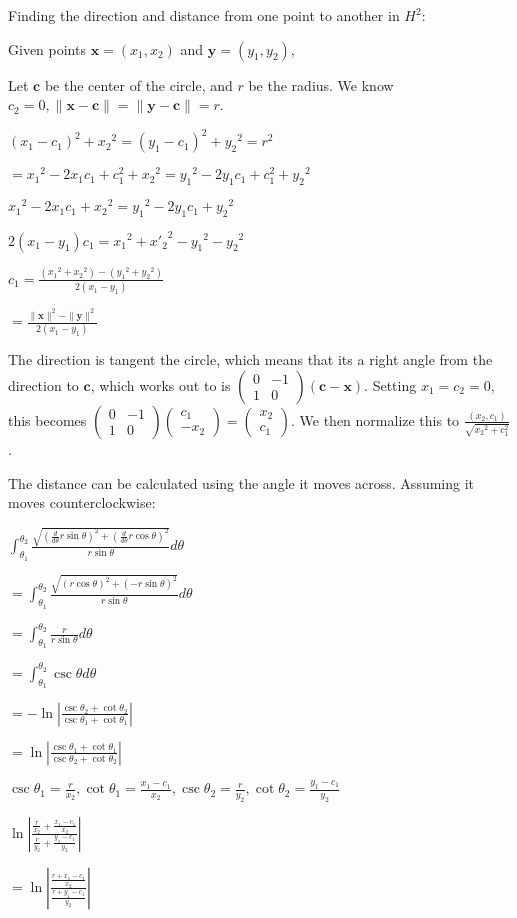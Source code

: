 \documentclass[12pt]{amsart}
\newcommand{\mat}[4]{\left(\begin{array}{ccc} #1 & #2 \\#3 & #4 \end{array} \right)}
\newcommand{\vect}[2]{\left(\begin{array}{ccc} #1 \\#2 \end{array} \right)}
\begin{document}
Finding the direction and distance from one point to another in $H^2$:

Given points $\textbf{x} = (x_1,x_2)$ and $\textbf{y} = (y_1,y_2)$,

Let $\textbf{c}$ be the center of the circle, and $r$ be the radius. We know $c_2 = 0, \|\textbf{x}-\textbf{c}\| = \|\textbf{y}-\textbf{c}\| = r$.

$(x_1-c_1)^2+{x_2}^2 = (y_1-c_1)^2+{y_2}^2 = r^2$

$= {x_1}^2-2x_1c_1+c_1^2+{x_2}^2 = {y_1}^2-2y_1c_1+c_1^2+{y_2}^2$

${x_1}^2-2x_1c_1+{x_2}^2 = {y_1}^2-2y_1c_1+{y_2}^2$

$2(x_1-y_1)c_1 = {x_1}^2+{x'_2}^2-{y_1}^2-{y_2}^2$

$c_1 = \frac{({x_1}^2+{x_2}^2)-({y_1}^2+{y_2}^2)}{2(x_1-y_1)}$

$= \frac{\|\textbf{x}\|^2-\|\textbf{y}\|^2}{2(x_1-y_1)}$

The direction is tangent the circle, which means that its a right angle from the direction to $\textbf{c}$, which works out to is $\mat{0}{-1}{1}{0}(\textbf{c}-\textbf{x})$. Setting $x_1 = c_2 = 0$, this becomes $\mat{0}{-1}{1}{0}\vect{c_1}{-x_2} = \vect{x_2}{c_1}$. We then normalize this to $\frac{(x_2,c_1)}{\sqrt{{x_2}^2+c_1^2}}$.

The distance can be calculated using the angle it moves across. Assuming it moves counterclockwise:

$\int_{\theta_1}^{\theta_2} \frac{\sqrt{(\frac{d}{d\theta}r\sin\theta)^2+(\frac{d}{d\theta}r\cos\theta)^2}}{r\sin\theta} d\theta$

$= \int_{\theta_1}^{\theta_2} \frac{\sqrt{(r\cos\theta)^2+(-r\sin\theta)^2}}{r\sin\theta} d\theta$

$= \int_{\theta_1}^{\theta_2} \frac{r}{r\sin\theta} d\theta$

$= \int_{\theta_1}^{\theta_2} \csc\theta d\theta$

$= -\ln\left|\frac{\csc\theta_2+\cot\theta_2}{\csc\theta_1+\cot\theta_1}\right|$

$= \ln\left|\frac{\csc\theta_1+\cot\theta_1}{\csc\theta_2+\cot\theta_2}\right|$

$\csc\theta_1 = \frac{r}{x_2}, \cot\theta_1 = \frac{x_1-c_1}{x_2}, \csc\theta_2 = \frac{r}{y_2}, \cot\theta_2 = \frac{y_1-c_1}{y_2}$

$\ln\left|\frac{\frac{r}{x_2}+\frac{x_1-c_1}{x_2}}{\frac{r}{y_2}+\frac{y_1-c_1}{y_2}}\right|$

$= \ln\left|\frac{\frac{r+x_1-c_1}{x_2}}{\frac{r+y_1-c_1}{y_2}}\right|$
\end{document}
